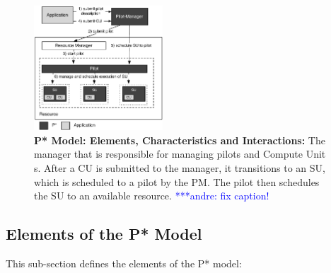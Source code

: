 \documentclass[conference,final]{IEEEtran}
\newcommand{\alnote}[1]{ {\textcolor{blue} { ***andre: #1 }}}
\newcommand{\alnote}[1]{}
\newcommand{\computeunit}{Compute Unit\xspace}
\newcommand{\up}{\vspace*{-1em}}
\newcommand{\upp}{\vspace*{-0.5em}}
\begin{document}
\begin{figure}[t]
    \centering\up
    \includegraphics[width=0.43\textwidth]{figures/pstar_model_single.pdf}
    \caption{ \textbf{P* Model: Elements, Characteristics and Interactions:} The 	 	
  	  manager that is responsible for managing
      pilots and \computeunit s. After a CU is submitted to the manager, it
      transitions to an SU, which is scheduled to a pilot by the
      PM. The pilot then schedules the SU to an available
      resource. \alnote{fix caption!}
      \upp\upp}
    \label{fig:figures_pstar}
\end{figure}




%

\noindent 
\subsection{Elements of the P* Model \upp\upp}
\noindent This sub-section defines the elements of the P* model:
\end{document}
